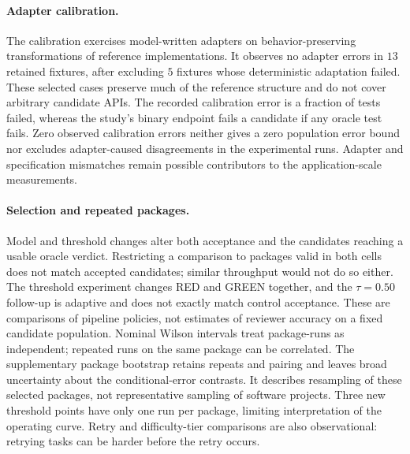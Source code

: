 \paragraph{Adapter calibration.} The calibration exercises model-written adapters on
behavior-preserving transformations of reference implementations. It observes no adapter errors
in $13$ retained fixtures, after excluding $5$ fixtures whose deterministic adaptation failed.
These selected cases preserve much of the reference structure and do not cover arbitrary
candidate APIs. The recorded calibration error is a fraction of tests failed, whereas the study's
binary endpoint fails a candidate if any oracle test fails. Zero observed calibration errors
neither gives a zero population error bound nor excludes adapter-caused disagreements in the
experimental runs. Adapter and specification mismatches remain possible contributors to the
application-scale measurements.

\paragraph{Selection and repeated packages.} Model and threshold changes alter both acceptance
and the candidates reaching a usable oracle verdict. Restricting a comparison to packages valid
in both cells does not match accepted candidates; similar throughput would not do so either.
The threshold experiment changes RED and GREEN together, and the $\tau{=}0.50$ follow-up is
adaptive and does not exactly match control acceptance. These are comparisons of pipeline
policies, not estimates of reviewer accuracy on a fixed candidate population. Nominal Wilson
intervals treat package-runs as independent; repeated runs on the same package can be correlated.
The supplementary package bootstrap retains repeats and pairing and leaves broad uncertainty
about the conditional-error contrasts. It describes resampling of these selected packages,
not representative sampling of software projects. Three new threshold points have only one
run per package, limiting interpretation of the operating curve. Retry and difficulty-tier
comparisons are also observational: retrying tasks can be harder before the retry occurs.

